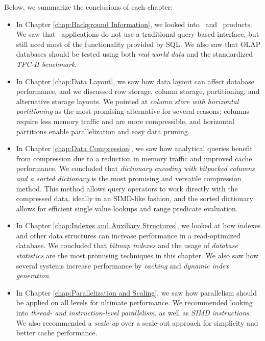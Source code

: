 Below, we summarize the conclusions of each chapter:
\begin{itemize}
  \item In Chapter \ref{chap:Background Information}, we looked into \bi~and \bd~products. We saw that \bd~applications do not use a traditional query-based interface, but still need most of the functionality provided by SQL. We also saw that OLAP databases should be tested using both \textit{real-world data} and the standardized \textit{TPC-H benchmark}.

  \item In Chapter \ref{chap:Data Layout}, we saw how data layout can affect database performance, and we discussed row storage, column storage, partitioning, and alternative storage layouts. We pointed at \textit{column store with horizontal partitioning} as the most promising alternative for several reasons; columns require less memory traffic and are more compressible, and horizontal partitions enable parallelization and easy data pruning.

  \item In Chapter \ref{chap:Data Compression}, we saw how analytical queries benefit from compression due to a reduction in memory traffic and improved cache performance. We concluded that \textit{dictionary encoding with bitpacked columns and a sorted dictionary} is the most promising and versatile compression method. This method allows query operators to work directly with the compressed data, ideally in an SIMD-like fashion, and the sorted dictionary allows for efficient single value lookups and range predicate evaluation.
    
  \item In Chapter \ref{chap:Indexes and Auxiliary Structures}, we looked at how indexes and other data structures can increase performance in a read-optimized database. We concluded that \textit{bitmap indexes} and the usage of \textit{database statistics} are the most promising techniques in this chapter. We also saw how several systems increase performance by \textit{caching} and \textit{dynamic index generation}.

  \item In Chapter \ref{chap:Parallelization and Scaling}, we saw how parallelism should be applied on all levels for ultimate performance. We recommended looking into \textit{thread- and instruction-level parallelism}, as well as \textit{SIMD instructions}. We also recommended a \textit{scale-up} over a scale-out approach for simplicity and better cache performance.


\end{itemize}
